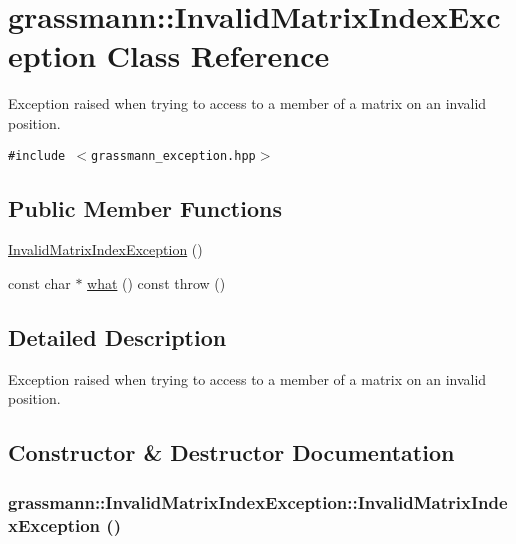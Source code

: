 \hypertarget{classgrassmann_1_1InvalidMatrixIndexException}{
\section{grassmann::InvalidMatrixIndexException Class Reference}
\label{classgrassmann_1_1InvalidMatrixIndexException}
}
Exception raised when trying to access to a member of a matrix on an invalid position.  


{\tt \#include $<$grassmann\_\-exception.hpp$>$}

\subsection*{Public Member Functions}
\begin{CompactItemize}
\item 
\hyperlink{classgrassmann_1_1InvalidMatrixIndexException_a035f610869bf3ab4bef381d689ae14c}{InvalidMatrixIndexException} ()
\item 
const char $\ast$ \hyperlink{classgrassmann_1_1InvalidMatrixIndexException_c6b2a40bb3c141cbef38dd30672fe488}{what} () const   throw ()
\end{CompactItemize}


\subsection{Detailed Description}
Exception raised when trying to access to a member of a matrix on an invalid position. 

\subsection{Constructor \& Destructor Documentation}
\hypertarget{classgrassmann_1_1InvalidMatrixIndexException_a035f610869bf3ab4bef381d689ae14c}{
\subsubsection[InvalidMatrixIndexException]{\setlength{\rightskip}{0pt plus 5cm}grassmann::InvalidMatrixIndexException::InvalidMatrixIndexException ()}}
\label{classgrassmann_1_1InvalidMatrixIndexException_a035f610869bf3ab4bef381d689ae14c}




